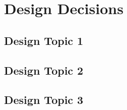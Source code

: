
\chapter{Design Decisions}
\label{chap:Design Decisions}


\section{Design Topic 1}
\label{sec:Design Topic 1}


\section{Design Topic 2}
\label{sec:Design Topic 2}


\section{Design Topic 3}
\label{sec:Design Topic 3}
